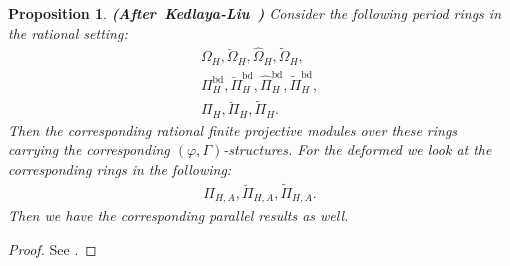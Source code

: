 \documentclass[12pt]{amsart}
\newtheorem{proposition}[theorem]{Proposition}
\theoremstyle{definition}
\numberwithin{equation}{section}
\begin{document}
%
%



\begin{proposition} \mbox{\bf{(After Kedlaya-Liu \cite[Theorem 5.7.4]{KL16})}} \label{proposition2.20}
Consider the following period rings in the rational setting:
\begin{align}
\Omega_H,\breve{\Omega}_H,\widehat{\Omega}_H,\widetilde{\Omega}_H,\\
\Pi^{\mathrm{bd}}_H,\breve{\Pi}_H^{\mathrm{bd}},\widehat{\Pi}_H^{\mathrm{bd}},\widetilde{\Pi}_H^{\mathrm{bd}},\\
\Pi_H,\breve{\Pi}_H,\widetilde{\Pi}_H.	
\end{align}
Then the corresponding rational finite projective modules over these rings carrying the corresponding $(\varphi,\Gamma)$-structures. For the deformed we look at the corresponding rings in the following:
\begin{align}
\Pi_{H,A},\breve{\Pi}_{H,A}
,\widetilde{\Pi}_{H,A}.	
\end{align}	
Then we have the corresponding parallel results as well.
\end{proposition}

\begin{proof}
See \cite[Theorem 5.7.4]{KL16}.	
\end{proof}
\end{document}
